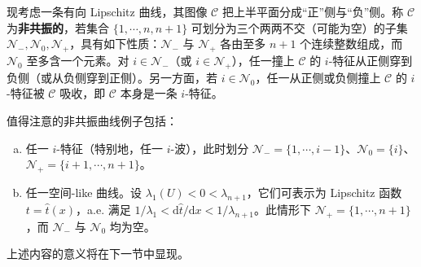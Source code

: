\documentclass[../../main.tex]{subfiles}
\begin{document}
现考虑一条有向 Lipschitz 曲线，其图像 $\mathscr{C}$ 把上半平面分成``正''侧与``负''侧。称 $\mathscr{C}$ 为\textbf{非共振的}，若集合 $\{1,\cdots,n,n+1\}$ 可划分为三个两两不交（可能为空）的子集 $\mathscr{N}_-,\mathscr{N}_0,\mathscr{N}_+$，具有如下性质：$\mathscr{N}_-$ 与 $\mathscr{N}_+$ 各由至多 $n+1$ 个连续整数组成，而 $\mathscr{N}_0$ 至多含一个元素。对 $i\in\mathscr{N}_-$（或 $i\in\mathscr{N}_+$），任一撞上 $\mathscr{C}$ 的 $i$-特征从正侧穿到负侧（或从负侧穿到正侧）。另一方面，若 $i\in\mathscr{N}_0$，任一从正侧或负侧撞上 $\mathscr{C}$ 的 $i$-特征被 $\mathscr{C}$ 吸收，即 $\mathscr{C}$ 本身是一条 $i$-特征。

值得注意的非共振曲线例子包括：
\begin{enumerate}[(a)]
\item 任一 $i$-特征（特别地，任一 $i$-波），此时划分 $\mathscr{N}_-=\{1,\cdots,i-1\}$、$\mathscr{N}_0=\{i\}$、$\mathscr{N}_+=\{i+1,\cdots,n+1\}$。
\item 任一空间-like 曲线。设 $\lambda_1(U)<0<\lambda_{n+1}$，它们可表示为 Lipschitz 函数 $t=\hat t(x)$，a.e. 满足 $1/\lambda_1<\mathrm{d}\hat t/\mathrm{d}x<1/\lambda_{n+1}$。此情形下 $\mathscr{N}_+=\{1,\cdots,n+1\}$，而 $\mathscr{N}_-$ 与 $\mathscr{N}_0$ 均为空。
\end{enumerate}

上述内容的意义将在下一节中显现。
\end{document}
